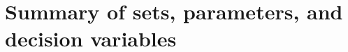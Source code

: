 \documentclass{article}
\begin{document}





\appendix

\section{Summary of sets, parameters, and decision variables}\label{appendix:sets}
\end{document}
